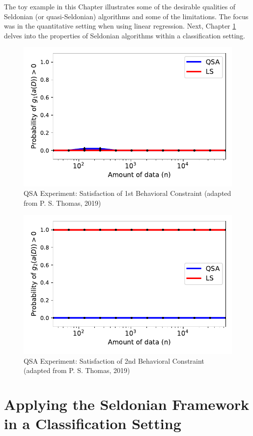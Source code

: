 \documentclass[12pt, twoside]{amherstthesis}
\begin{document}
The toy example in this Chapter illustrates some of the desirable qualities of Seldonian (or quasi-Seldonian) algorithms and some of the limitations. The focus was in the quantitative setting when using linear regression. Next, Chapter \ref{chap-3} delves into the properties of Seldonian algorithms within a classification setting.
\begin{figure}

{\centering \includegraphics{Dasha-Asienga_StatThesis_files/figure-latex/fig6-7} 

}

\caption{QSA Experiment: Satisfaction of 1st Behavioral Constraint (adapted from P. S. Thomas, 2019)}\label{fig:fig6}
\end{figure}
\begin{figure}

{\centering \includegraphics{Dasha-Asienga_StatThesis_files/figure-latex/fig7-9} 

}

\caption{QSA Experiment: Satisfaction of 2nd Behavioral Constraint (adapted from P. S. Thomas, 2019)}\label{fig:fig7}
\end{figure}
\hypertarget{chap-3}{%
\chapter{Applying the Seldonian Framework in a Classification Setting}\label{chap-3}}
\end{document}

